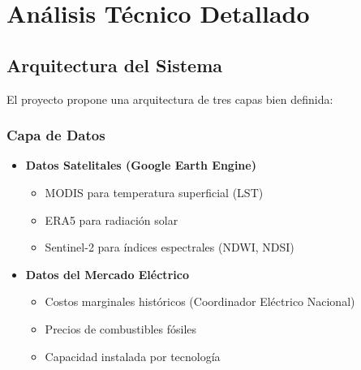 \documentclass[12pt,a4paper]{article}
\begin{document}
\section{Análisis Técnico Detallado}

\subsection{Arquitectura del Sistema}

El proyecto propone una arquitectura de tres capas bien definida:

\subsubsection{Capa de Datos}
\begin{itemize}
    \item \textbf{Datos Satelitales (Google Earth Engine)}
    \begin{itemize}
        \item MODIS para temperatura superficial (LST)
        \item ERA5 para radiación solar
        \item Sentinel-2 para índices espectrales (NDWI, NDSI)
    \end{itemize}
    
    \item \textbf{Datos del Mercado Eléctrico}
    \begin{itemize}
        \item Costos marginales históricos (Coordinador Eléctrico Nacional)
        \item Precios de combustibles fósiles
        \item Capacidad instalada por tecnología
    \end{itemize}
\end{itemize}
\end{document}
